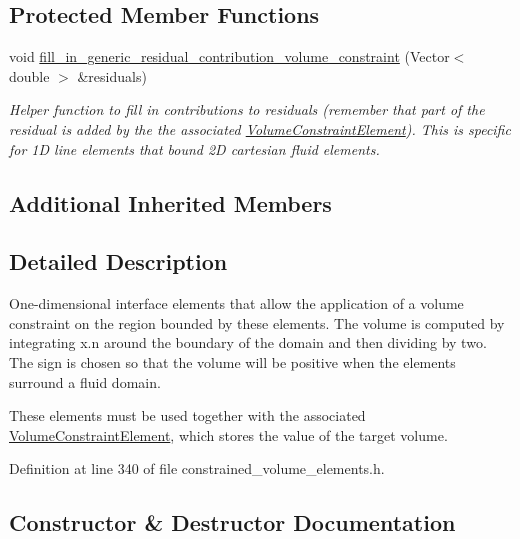 \subsection*{Protected Member Functions}
\begin{DoxyCompactItemize}
\item 
void \hyperlink{classoomph_1_1LineVolumeConstraintBoundingElement_a03145a064e559d786f730c85000f9fb4}{fill\+\_\+in\+\_\+generic\+\_\+residual\+\_\+contribution\+\_\+volume\+\_\+constraint} (Vector$<$ double $>$ \&residuals)
\begin{DoxyCompactList}\small\item\em Helper function to fill in contributions to residuals (remember that part of the residual is added by the the associated \hyperlink{classoomph_1_1VolumeConstraintElement}{Volume\+Constraint\+Element}). This is specific for 1D line elements that bound 2D cartesian fluid elements. \end{DoxyCompactList}\end{DoxyCompactItemize}
\subsection*{Additional Inherited Members}


\subsection{Detailed Description}
One-\/dimensional interface elements that allow the application of a volume constraint on the region bounded by these elements. The volume is computed by integrating x.\+n around the boundary of the domain and then dividing by two. The sign is chosen so that the volume will be positive when the elements surround a fluid domain.

These elements must be used together with the associated \hyperlink{classoomph_1_1VolumeConstraintElement}{Volume\+Constraint\+Element}, which stores the value of the target volume. 

Definition at line 340 of file constrained\+\_\+volume\+\_\+elements.\+h.



\subsection{Constructor \& Destructor Documentation}
\mbox{\label{classoomph_1_1LineVolumeConstraintBoundingElement_a39baabe26bcf3958b80fe3dd5430c347}} 
